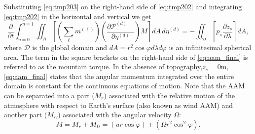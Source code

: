 \documentclass{agujournal}
\begin{document}
Substituting \eqref{eq:tmp203} on the right-hand side of \eqref{eq:tmp202} and integrating \eqref{eq:tmp202} in the horizontal and vertical we get
\begin{equation}
\frac{\partial}{\partial t}\int_{\eta=0}^{\eta=1}\iint_{\mathcal{D}}\left[ \left( \sum_\ell m^{(\ell)}\right) \left( \frac{\partial \mathcal{P}^{(d)}\quad }{\partial \eta^{(d)}} \right) M \right] dA\, d\eta^{(d)}=-\iint_{\mathcal{D}}\left[ p_s \frac{\partial z_s}{\partial \lambda}\right] dA,\label{eq:aam_final}
\end{equation}
where $\mathcal{D}$ is the global domain and $dA=r^2\cos\varphi d\lambda d\varphi$ is an infinitesimal spherical area. The term in the square brackets on the right-hand side of \eqref{eq:aam_final} is referred to as the mountain torque. In the absence of topography,$z_s=0$m, \eqref{eq:aam_final} states that the angular momentum integrated over the entire domain is constant for the continuous equations of motion. Note that the AAM can be separated into a part ($M_r$) associated with the relative motion of the atmosphere with respect to Earth's surface (also known as wind AAM) and another part ($M_{\Omega}$) associated with the angular velocity $\Omega$:
\begin{equation}
M=M_r+M_\Omega=\left( u r \cos \varphi\right)+\left(\Omega r^2 \cos^2 \varphi \right) .
\end{equation}
\end{document}
